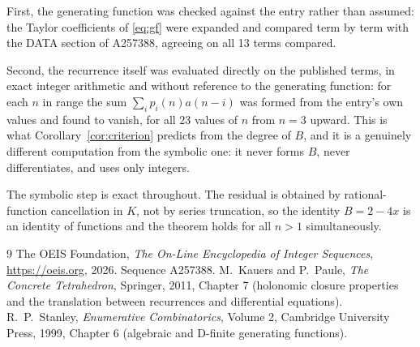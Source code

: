 \documentclass[11pt,a4paper]{article}
\theoremstyle{plain}
\theoremstyle{definition}
\begin{document}
First, the generating function was checked against the entry rather than assumed: the
Taylor coefficients of \eqref{eq:gf} were expanded and compared term by term with the DATA
section of A257388, agreeing on all 13 terms compared.

Second, the recurrence itself was evaluated directly on the published terms, in exact
integer arithmetic and without reference to the generating function: for each $n$ in range
the sum $\sum_{i}p_{i}(n)a(n-i)$ was formed from the entry's own values and found to
vanish, for all 23 values of $n$ from $n=3$ upward. This is what
Corollary~\ref{cor:criterion} predicts from the degree of $B$, and it is a genuinely
different computation from the symbolic one: it never forms $B$, never differentiates, and
uses only integers.

The symbolic step is exact throughout. The residual is obtained by rational-function
cancellation in $K$, not by series truncation, so the identity $B=2 - 4 x$ is an
identity of functions and the theorem holds for all $n>1$ simultaneously.

\begin{thebibliography}{9}
 The OEIS Foundation, \emph{The On-Line Encyclopedia of Integer Sequences},
\url{https://oeis.org}, 2026. Sequence A257388.
 M.~Kauers and P.~Paule, \emph{The Concrete Tetrahedron}, Springer, 2011,
Chapter 7 (holonomic closure properties and the translation between recurrences and
differential equations).
 R.~P.~Stanley, \emph{Enumerative Combinatorics}, Volume 2, Cambridge
University Press, 1999, Chapter 6 (algebraic and D-finite generating functions).
\end{thebibliography}
\end{document}
